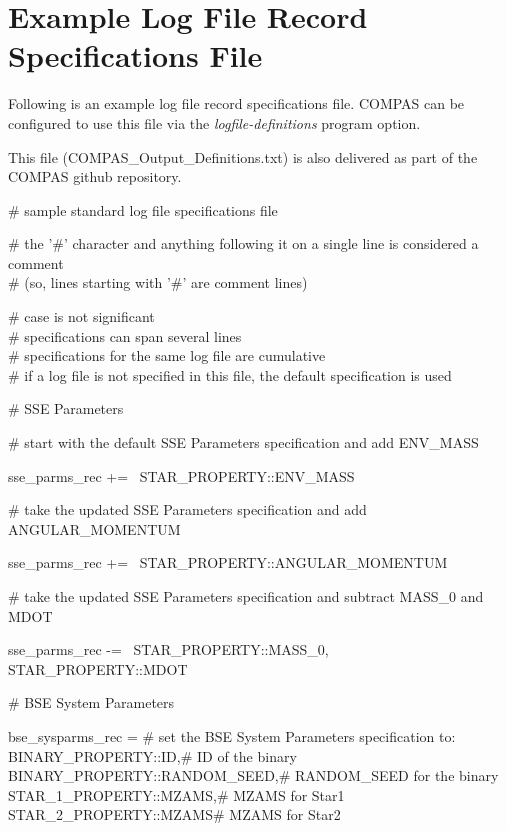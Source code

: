 \section{Example Log File Record Specifications File}
\label{sec:ExampleLogFileRecordSpecsFile}

Following is an example log file record specifications file.  COMPAS can be configured to use this file via the \textit{logfile-definitions} program option.

This file (COMPAS\_Output\_Definitions.txt) is also delivered as part of the COMPAS github repository.

\# sample standard log file specifications file

\# the '\#' character and anything following it on a single line is considered a comment \\
\# (so, lines starting with '\#' are comment lines)

\# case is not significant \\
\# specifications can span several lines \\
\# specifications for the same log file are cumulative \\
\# if a log file is not specified in this file, the default specification is used

\medskip
\# SSE Parameters

\# start with the default SSE Parameters specification and add ENV\_MASS

\small
sse\_parms\_rec += \lcb\ STAR\_PROPERTY::ENV\_MASS\ \rcb
\normalsize

\# take the updated SSE Parameters specification and add ANGULAR\_MOMENTUM

sse\_parms\_rec += \lcb\ STAR\_PROPERTY::ANGULAR\_MOMENTUM\ \rcb

\# take the updated SSE Parameters specification and subtract MASS\_0 and MDOT

sse\_parms\_rec -= \lcb\ STAR\_PROPERTY::MASS\_0, STAR\_PROPERTY::MDOT\ \rcb         

\medskip
\# BSE System Parameters

\small
bse\_sysparms\_rec = \lcb\tabto{20em}\# set the BSE System Parameters specification to: \\
\tabto{1.75em}BINARY\_PROPERTY::ID,\tabto{20em}\# ID of the binary \\
\tabto{1.75em}BINARY\_PROPERTY::RANDOM\_SEED,\tabto{20em}\# RANDOM\_SEED for the binary \\ \tabto{1.75em}STAR\_1\_PROPERTY::MZAMS,\tabto{20em}\# MZAMS for Star1 \\ \tabto{1.75em}STAR\_2\_PROPERTY::MZAMS\tabto{20em}\# MZAMS for Star2 \\
\rcb
\normalsize

